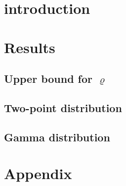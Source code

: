 \documentclass{scrartcl}
\begin{document}
\section{introduction}

  

\section{Results}

  

  \subsection*{Upper bound for $\varrho$}

    

  \subsection*{Two-point distribution}  

    

  \subsection*{Gamma distribution}

    

    \newpage
\clearpage     
\section{Appendix}

  



\printbibliography
  
  
\end{document}
